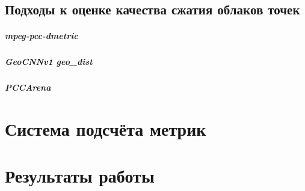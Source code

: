 \section{Подходы к оценке качества сжатия облаков точек}





\paragraph{mpeg-pcc-dmetric}

\paragraph{GeoCNNv1 geo\_dist}

\paragraph{PCCArena}


\chapter{Система подсчёта метрик}




\chapter{Результаты работы}





